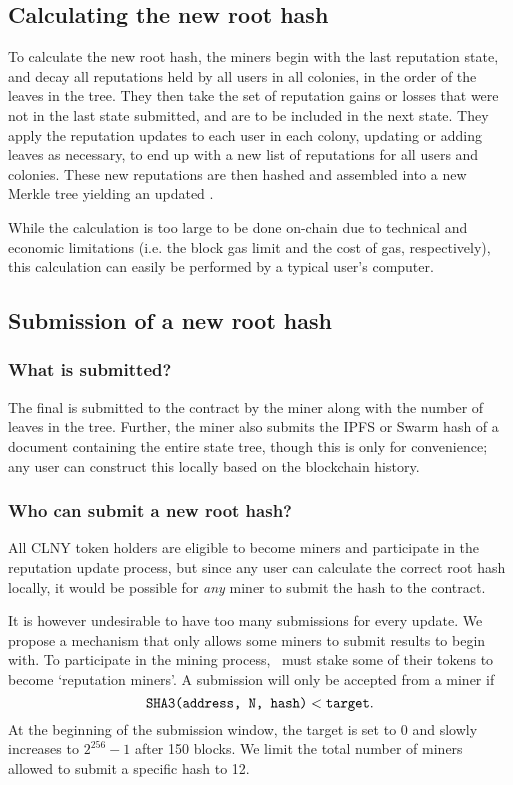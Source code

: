 \subsection{Calculating the new root hash}
To calculate the new root hash, the miners begin with the last reputation state, and decay all reputations held by all users in all colonies, in the order of the leaves in the tree. They then take the set of reputation gains or losses that were not in the last state submitted, and are to be included in the next state. They apply the reputation updates to each user in each colony, updating or adding leaves as necessary, to end up with a new list of reputations for all users and colonies. These new reputations are then hashed and assembled into a new Merkle tree yielding an updated .

While the calculation is too large to be done on-chain due to technical and economic limitations (i.e. the block gas limit and the cost of gas, respectively), this calculation can easily be performed by a typical user's computer.

\subsection{Submission of a new root hash}
%
\subsubsection*{What is submitted?}
The final  is submitted to the contract by the miner along with the number of leaves in the tree. Further, the miner also submits the IPFS or Swarm hash of a document containing the entire state tree, though this is only for convenience; any user can construct this locally based on the blockchain history.
%
\subsubsection*{Who can submit a new root hash?}
All CLNY token holders are eligible to become miners and participate in the reputation update process, but since any user can calculate the correct root hash locally, it would be possible for \emph{any} miner to submit the hash to the contract.

It is however undesirable to have too many submissions for every update. We propose a mechanism that only allows some miners to submit results to begin with. To participate in the mining process, \rcths\ must stake some of their tokens to become `reputation miners'. A submission will only be accepted from a miner if 
\begin{equation*}\label{eq:mining-difficulty}
\texttt{SHA3(address, N, hash)} < \texttt{target}. 
\end{equation*}
At the beginning of the submission window, the target is set to 0 and slowly increases to $2^{256}-1$ after 150 blocks. We limit the total number of miners allowed to submit a specific hash to 12.

